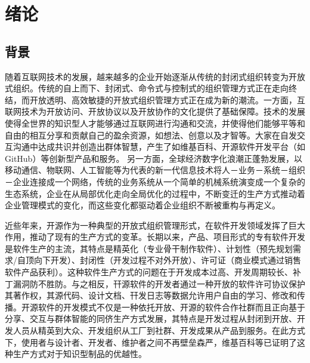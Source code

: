 
\section{绪论}
 
\subsection{背景}
\par 随着互联网技术的发展，越来越多的企业开始逐渐从传统的封闭式组织转变为开放式组织。传统的自上而下、封闭式、命令式与控制式的组织管理方式正在走向终结，而开放透明、高效敏捷的开放式组织管理方式正在成为新的潮流。一方面，互联网技术为开放访问、开放协议以及开放协作的文化提供了基础保障。技术的发展使得全世界的知识型人才能够通过互联网进行沟通和交流，并使得他们能够平等和自由的相互分享和贡献自己的盈余资源，如想法、创意以及才智等。大家在自发交互沟通中达成共识并创造出群体智慧，产生了如维基百科、开源软件开发平台（如GitHub）等创新型产品和服务\cite{王璐2017开放式创新的协同演化机制研究}。 另一方面，全球经济数字化浪潮正蓬勃发展，以移动通信、物联网、人工智能等为代表的新一代信息技术将人－业务－系统－组织－企业连接成一个网络，传统的业务系统从一个简单的机械系统演变成一个复杂的生态系统，企业在从局部优化走向全局优化的过程中，不断变迁的生产方式推动着企业管理模式的变化，而这些变化都驱动着企业组织不断被重构与再定义\cite{fuchs2008wikinomics}。

\par 近些年来，开源作为一种典型的开放式组织管理形式，在软件开发领域发挥了巨大作用，推动了现有的生产方式的变革。长期以来，产品、项目形式的专有软件开发是软件生产的主流，其特点是精英化（专业骨干制作软件）、计划性（预先规划需求/自顶向下开发）、封闭性（开发过程不对外开放）、许可证（商业模式通过销售软件产品获利）。这种软件生产方式的问题在于开发成本过高、开发周期较长、补丁漏洞防不胜防。与之相反，幵源软件的开发者通过一种开放的软件许可协议保护其著作权，其源代码、设计文档、幵发日志等数据允许用户自由的学习、修改和传播。开源软件的开发模式不仅是一种依托开放、开源的软件合作社群而且正向基于分享、交互与群体智能的同侪生产方式发展，其特点是开发过程从封闭到开放、开发人员从精英到大众、开发组织从工厂到社群、开发成果从产品到服务。在此方式下，使用者与设计者、开发者、维护者之间不再壁垒森严，维基百科等已证明了这种生产方式对于知识型制品的优越性。\cite{李其锋2014面向开源社区的开发者群体行为分析方法}

